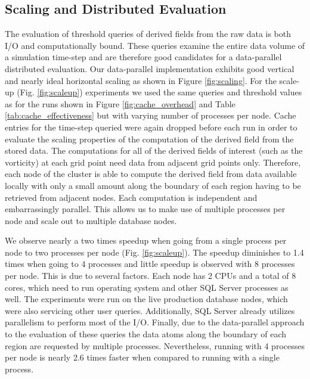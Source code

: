\documentclass{sig-alternate}
\begin{document}
\subsection{Scaling and Distributed Evaluation}
The evaluation of threshold queries of derived fields from the raw data is both I/O and computationally bound. These queries examine the entire data
volume of a simulation time-step and are therefore good candidates for a data-parallel distributed evaluation. 
Our data-parallel implementation exhibits good vertical and nearly ideal horizontal scaling as shown in Figure \ref{fig:scaling}. 
For the scale-up (Fig. \ref{fig:scaleup}) experiments we used the same
queries and threshold values as for the runs shown in Figure \ref{fig:cache_overhead} and Table \ref{tab:cache_effectiveness} 
but with varying number of processes per node. Cache entries for the
time-step queried were again dropped before each run in order to evaluate the scaling properties of the computation of the derived field from the stored data.
The computations for all of 
the derived fields of interest (such as the vorticity) at each grid point need data from adjacent grid points only. Therefore, each node of the cluster is able to
compute the derived field from data available locally with only a small amount along the boundary of each region having to be retrieved from adjacent nodes.
Each computation is independent and embarrassingly parallel. This allows us to make use of multiple processes per node and scale out to
multiple database nodes.

We observe nearly a two times speedup when going from a single process per node to two processes per node (Fig. \ref{fig:scaleup}). 
The speedup diminishes to 1.4 times when going to 4 processes and little speedup is 
observed with 8 processes per node. This is due to several factors. Each node has 2 CPUs and a total of 8 cores, which need to run operating system and other SQL Server
processes as well. The experiments were run on the live production database nodes, which were also servicing other user queries. Additionally, SQL
Server already utilizes parallelism to perform most of the I/O. Finally, due to the data-parallel approach to the evaluation of these queries the data atoms along
the boundary of each region are requested by multiple processes. Nevertheless, running with 4 processes per node is nearly 2.6 times faster when
compared to running with a single process.
\end{document}
